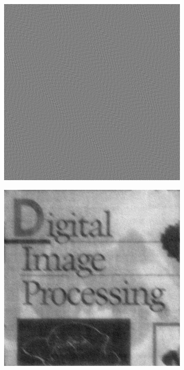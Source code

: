 \begin{figure}[h]
\begin{subfigure}[b]{0.3\linewidth}
		\caption{}
		\label{fig:5_gaussian_65}
	\end{subfigure}
  	\begin{subfigure}[b]{0.3\linewidth}
		\includegraphics[width=\linewidth]{myfigure/p5/5_inverse_65.png}
		\caption{}
		\label{fig:5_inverse_65}
	\end{subfigure}
  	\begin{subfigure}[b]{0.3\linewidth}
		\includegraphics[width=\linewidth]{myfigure/p5/5_wiener_65.png}

\end{subfigure}
\end{figure}
